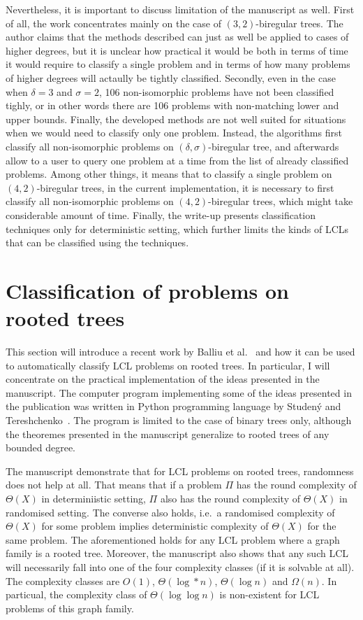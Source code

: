 Nevertheless, it is important to discuss limitation of the manuscript as well. First of all,
the work concentrates mainly on the case of $(3, 2)$-biregular trees. The author claims that
the methods described can just as well be applied to cases of higher degrees, but it is unclear
how practical it would be both in terms of time it would require to classify a single problem
and in terms of how many problems of higher degrees will actaully be tightly classified. Secondly,
even in the case when $\delta = 3$ and $\sigma = 2$, 106 non-isomorphic problems have not been
classified tighly, or in other words there are 106 problems with non-matching lower and upper bounds.
Finally, the developed methods are not well suited for situations when we would need to
classify only one problem. Instead, the algorithms first classify all non-isomorphic
problems on $(\delta, \sigma)$-biregular tree, and afterwards allow to a user to query
one problem at a time from the list of already classified problems. Among other things,
it means that to classify a single problem on $(4, 2)$-biregular trees, in the current
implementation, it is necessary to first classify all non-isomorphic problems on $(4, 2)$-biregular trees,
which might take considerable amount of time. Finally, the write-up presents classification
techniques only for deterministic setting, which further limits the kinds of LCLs that
can be classified using the techniques.

\section{Classification of problems on rooted trees}

This section will introduce a recent work by Balliu et al.~\cite{Balliu2021}
and how it can be used to automatically classify LCL problems on rooted trees.
In particular, I will concentrate on the practical implementation of the
ideas presented in the manuscript. The computer program implementing some of the ideas presented in the
publication was written in Python programming language by Studený and
Tereshchenko~\cite{Studeny2021}. The program is limited to the case
of binary trees only, although the theoremes presented in the manuscript
generalize to rooted trees of any bounded degree.

The manuscript demonstrate that for LCL problems on rooted trees,
randomness does not help at all. That means that if a problem $\Pi$
has the round complexity of $\Theta(X)$ in determiniistic setting, $\Pi$
also has the round complexity of $\Theta(X)$ in randomised setting. The
converse also holds, i.e.\ a randomised complexity of $\Theta(X)$ for some
problem implies deterministic complexity of $\Theta(X)$ for the same problem.
The aforementioned holds for any LCL problem where a graph family is
a rooted tree. Moreover, the manuscript also shows that any such LCL will
necessarily fall into one of the four complexity classes (if it is solvable at all). The complexity classes are $O(1)$, $\Theta(\log* n)$, $\Theta(\log n)$
and $\Omega(n)$. In particual, the complexity class of $\Theta(\log \log n)$
is non-existent for LCL problems of this graph family.

